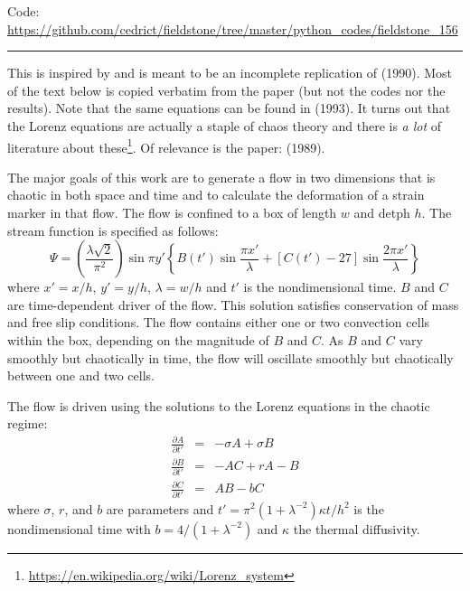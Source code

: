 \begin{center}
\inpython
{\small Code: \url{https://github.com/cedrict/fieldstone/tree/master/python_codes/fieldstone_156}}
\end{center}

\par\noindent\rule{\textwidth}{0.4pt}


This \stone is inspired by and is meant to be an incomplete 
replication of \textcite{ketu90} (1990). Most of the text
below is copied verbatim from the paper (but not the codes nor the results).
Note that the same equations can be found in \textcite{kell93} (1993).
It turns out that the Lorenz equations are actually a staple of chaos theory and there 
is {\it a lot} of literature about these\footnote{\url{https://en.wikipedia.org/wiki/Lorenz_system}}.
Of relevance is the paper: \textcite{sttu89} (1989).

The major goals of this work are to generate a flow in two
dimensions that is chaotic in both space and time and
to calculate the deformation of a strain marker in that flow.
The flow is confined to a box of length $w$ and detph $h$.
The stream function is specified as follows:
\begin{equation}
\Psi = 
\left(
\frac{\lambda \sqrt 2}{\pi^2}
\right)
\sin \pi y'
\left\{
B(t') \sin \frac{\pi x'}{\lambda}
+[C(t')-27]\sin \frac{2 \pi x'}{\lambda}
\right\}
\label{eq:ketupsi}
\end{equation}
where $x'=x/h$, $y'=y/h$, $\lambda=w/h$ and $t'$ is the nondimensional
time. 
$B$ and $C$ are time-dependent driver of the flow. This solution satisfies 
conservation of mass and free slip conditions. 
The flow contains either one or two convection cells within the box,
depending on the magnitude of $B$ and $C$.
As $B$ and $C$ vary smoothly but chaotically in time, the flow will oscillate
smoothly but chaotically between one and two cells. 

The flow is driven using the solutions to the Lorenz equations in the chaotic regime:
\begin{eqnarray}
\frac{\partial A}{\partial t'} &=& -\sigma A + \sigma B \label{eq:Lorenz1}\\ 
\frac{\partial B}{\partial t'} &=& -AC + rA -B \label{eq:Lorenz2}\\ 
\frac{\partial C}{\partial t'} &=& AB - bC \label{eq:Lorenz3}
\end{eqnarray}
where $\sigma$, $r$, and $b$ are parameters and $t'=\pi^2 (1+\lambda^{-2}) \kappa t /h^2$
is the nondimensional time with $b=4/(1+\lambda^{-2})$ and $\kappa$ the thermal diffusivity. 

